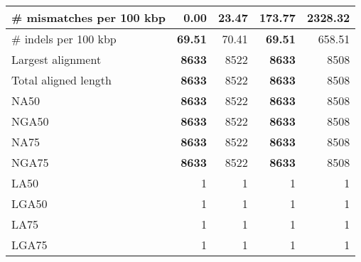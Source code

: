 \documentclass[12pt,a4paper]{article}
\begin{document}
\begin{table}[ht]
\begin{center}
\begin{tabular}{|l*{4}{|r}|}
\# mismatches per 100 kbp & {\bf 0.00} & 23.47 & 173.77 & 2328.32 \\ \hline
\# indels per 100 kbp & {\bf 69.51} & 70.41 & {\bf 69.51} & 658.51 \\ \hline
Largest alignment & {\bf 8633} & 8522 & {\bf 8633} & 8508 \\ \hline
Total aligned length & {\bf 8633} & 8522 & {\bf 8633} & 8508 \\ \hline
NA50 & {\bf 8633} & 8522 & {\bf 8633} & 8508 \\ \hline
NGA50 & {\bf 8633} & 8522 & {\bf 8633} & 8508 \\ \hline
NA75 & {\bf 8633} & 8522 & {\bf 8633} & 8508 \\ \hline
NGA75 & {\bf 8633} & 8522 & {\bf 8633} & 8508 \\ \hline
LA50 & 1 & 1 & 1 & 1 \\ \hline
LGA50 & 1 & 1 & 1 & 1 \\ \hline
LA75 & 1 & 1 & 1 & 1 \\ \hline
LGA75 & 1 & 1 & 1 & 1 \\ \hline
\end{tabular}
\end{center}
\end{table}
\end{document}
